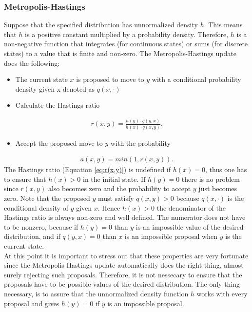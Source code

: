 \documentclass[english]{uzhpub}
\begin{document}
\subsubsection*{Metropolis-Hastings} \label{sec:Metropolis}
Suppose that the specified distribution has unnormalized density $h$. This means that $h$ is a positive constant multiplied by a probability density. Therefore, $h$ is a non-negative function that integrates (for continuous states) or sums (for discrete states) to a value that is finite and non-zero. The Metropolis-Hastings update does the following:
\begin{itemize}
 \item The current state $x$ is proposed to move to $y$ with a conditional probability density given x denoted as $q(x,\cdot)$
 \item Calculate the Hastings ratio
\end{itemize}
\begin{align}
 r(x,y) = \frac{h(y) \cdot q(y,x)} {h(x) \cdot q(x,y)}. \label{eq:r(x,y)}
\end{align}
\begin{itemize}
 \item Accept the proposed move to $y$ with the probability
\end{itemize}
\begin{align}
 a(x,y) = min(1,r(x,y)).
\end{align}
The Hastings ratio (Equation \ref{eq:r(x,y)}) is undefined if $h(x) = 0$, thus one has to ensure that $h(x) > 0$ in the initial state. If $h(y) = 0$ there is no problem since $r(x,y)$ also becomes zero and the probability to accept $y$ just becomes zero. Note that the proposed $y$ must satisfy $q(x,y) > 0$ because $q(x,\cdot)$ is the conditional density of $y$ given $x$. Hence $h(x) > 0$ the denominator of the Hastings ratio is always non-zero and well defined. The numerator does not have to be nonzero, because if $h(y) = 0$ than $y$ is an impossible value of the desired distribution, and if $q(y,x) = 0$ than $x$ is an impossible proposal when $y$ is the current state. \\
At this point it is important to stress out that these properties are very fortunate since the Metropolis Hastings update automatically does the right thing, almost surely rejecting such proposals. Therefore, it is not nessecary to ensure that the proposals have to be possible values of the desired distribution. The only thing necessary, is to assure that the unnormalized density function $h$ works with every proposal and gives $h(y) = 0$ if $y$ is an impossible proposal.
\end{document}
